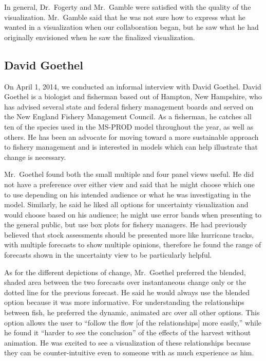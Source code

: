 In general, Dr.\ Fogerty and Mr.\ Gamble were satisfied with the quality of the visualization.  Mr.\ Gamble said that he was not sure how to express what he wanted in a visualization when our collaboration began, but he saw what he had originally envisioned when he saw the finalized visualization.  

\subsection{David Goethel}

On April 1, 2014, we conducted an informal interview with David Goethel.  David Goethel is a biologist and fisherman based out of Hampton, New Hampshire, who has advised several state and federal fishery management boards and served on the New England Fishery Management Council.  As a fisherman, he catches all ten of the species used in the MS-PROD model throughout the year, as well as others.  He has been an advocate for moving toward a more sustainable approach to fishery management and is interested in models which can help illustrate that change is necessary.  

Mr.\ Goethel found both the small multiple and four panel views useful.  He did not have a preference over either view and said that he might choose which one to use depending on his intended audience or what he was investigating in the model.  Similarly, he said he liked all options for uncertainty visualization and would choose based on his audience; he might use error bands when presenting to the general public, but use box plots for fishery managers.  He had previously believed that stock assessments should be presented more like hurricane tracks, with multiple forecasts to show multiple opinions, therefore he found the range of forecasts shown in the uncertainty view to be particularly helpful.

As for the different depictions of change, Mr.\ Goethel preferred the blended, shaded area between the two forecasts over instantaneous change only or the dotted line for the previous forecast.  He said he would always use the blended option because it was more informative.  For understanding the relationships between fish, he preferred the dynamic, animated arc over all other options.  This option allows the user to ``follow the flow [of the relationships] more easily,'' while he found it ``harder to see the conclusion'' of the effects of the harvest without animation.  He was excited to see a visualization of these relationships because they can be counter-intuitive even to someone with as much experience as him.


